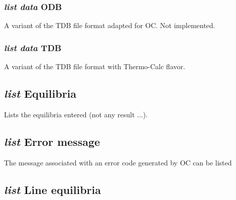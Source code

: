 \documentclass[12pt]{article}
\begin{document}
\subsubsection{{\em list data} ODB}

A variant of the TDB file format adapted for OC.  Not implemented.

\subsubsection{{\em list data} TDB}

A variant of the TDB file format with Thermo-Calc flavor.

\subsection{{\em list} Equilibria}

Lists the equilibria entered (not any result ...).

\subsection{{\em list} Error message}

The message associated with an error code generated by OC can be listed

\subsection{{\em list} Line equilibria}
\end{document}
